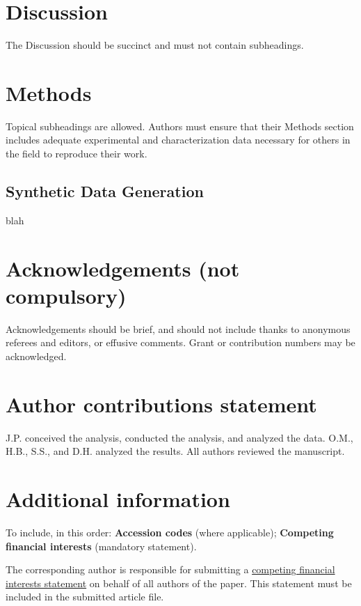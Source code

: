 \documentclass[fleqn,10pt]{wlscirep}
\begin{document}
\section*{Discussion}

The Discussion should be succinct and must not contain subheadings.

\section*{Methods}

Topical subheadings are allowed. Authors must ensure that their Methods section includes adequate experimental and characterization data necessary for others in the field to reproduce their work.
\subsection{Synthetic Data Generation}
blah




\section*{Acknowledgements (not compulsory)}

Acknowledgements should be brief, and should not include thanks to anonymous referees and editors, or effusive comments. Grant or contribution numbers may be acknowledged.

\section*{Author contributions statement}

J.P. conceived the analysis, conducted the analysis, and analyzed the data. O.M., H.B., S.S., and D.H. analyzed the results.  All authors reviewed the manuscript. 

\section*{Additional information}

To include, in this order: \textbf{Accession codes} (where applicable); \textbf{Competing financial interests} (mandatory statement). 

The corresponding author is responsible for submitting a \href{http://www.nature.com/srep/policies/index.html#competing}{competing financial interests statement} on behalf of all authors of the paper. This statement must be included in the submitted article file.
\end{document}
